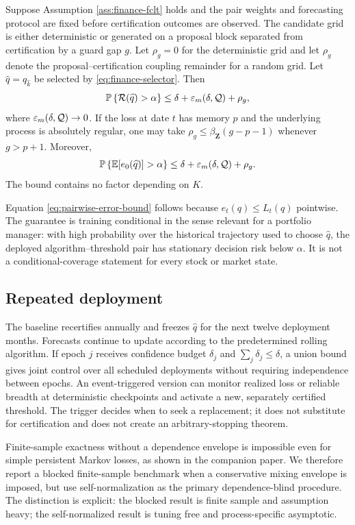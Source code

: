 \begin{theorem}
\label{thm:certified-ranking}
Suppose Assumption \ref{ass:finance-fclt} holds and the pair weights and forecasting protocol are fixed before certification outcomes are observed. The candidate grid is either deterministic or generated on a proposal block separated from certification by a guard gap $g$. Let $\rho_g=0$ for the deterministic grid and let $\rho_g$ denote the proposal--certification coupling remainder for a random grid. Let $\widehat q=q_{\widehat k}$ be selected by \eqref{eq:finance-selector}. Then
\begin{equation}
\mathbb P\left\{
\mathcal R(\widehat q)>\alpha
\right\}
\leq
\delta
+
\varepsilon_m(\delta,\mathcal Q)
+
\rho_g,
\label{eq:finance-risk-bound}
\end{equation}
where $\varepsilon_m(\delta,\mathcal Q)\to0$. If the loss at date $t$ has memory $p$ and the underlying process is absolutely regular, one may take $\rho_g\leq\beta_{\bm Z}(g-p-1)$ whenever $g>p+1$. Moreover,
\begin{equation}
\mathbb P\left\{
\mathbb E[e_0(\widehat q)]>\alpha
\right\}
\leq
\delta
+
\varepsilon_m(\delta,\mathcal Q)
+
\rho_g.
\label{eq:pairwise-error-bound}
\end{equation}
The bound contains no factor depending on $K$.
\end{theorem}

Equation \eqref{eq:pairwise-error-bound} follows because $e_t(q)\leq L_t(q)$ pointwise. The guarantee is training conditional in the sense relevant for a portfolio manager: with high probability over the historical trajectory used to choose $\widehat q$, the deployed algorithm--threshold pair has stationary decision risk below $\alpha$. It is not a conditional-coverage statement for every stock or market state.

\subsection{Repeated deployment}

The baseline recertifies annually and freezes $\widehat q$ for the next twelve deployment months. Forecasts continue to update according to the predetermined rolling algorithm. If epoch $j$ receives confidence budget $\delta_j$ and $\sum_j\delta_j\leq\delta$, a union bound gives joint control over all scheduled deployments without requiring independence between epochs. An event-triggered version can monitor realized loss or reliable breadth at deterministic checkpoints and activate a new, separately certified threshold. The trigger decides when to seek a replacement; it does not substitute for certification and does not create an arbitrary-stopping theorem.

Finite-sample exactness without a dependence envelope is impossible even for simple persistent Markov losses, as shown in the companion paper. We therefore report a blocked finite-sample benchmark when a conservative mixing envelope is imposed, but use self-normalization as the primary dependence-blind procedure. The distinction is explicit: the blocked result is finite sample and assumption heavy; the self-normalized result is tuning free and process-specific asymptotic.
